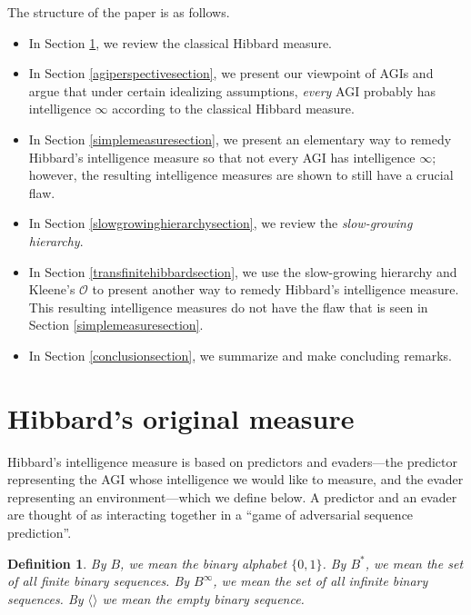 \documentclass{article}
\newtheorem{definition}{Definition}
\begin{document}
The structure of the paper is as follows.
\begin{itemize}
    \item
    In Section \ref{originalmeasuresection}, we review the classical Hibbard measure.
    \item
    In Section \ref{agiperspectivesection}, we present our viewpoint of AGIs and argue that
    under certain idealizing assumptions, \emph{every} AGI probably has intelligence
    $\infty$ according to the classical Hibbard measure.
    \item
    In Section \ref{simplemeasuresection}, we present an elementary way to
    remedy Hibbard's intelligence
    measure so that not every AGI has intelligence $\infty$; however, the resulting
    intelligence measures are shown to still have a crucial flaw.
    \item
    In Section \ref{slowgrowinghierarchysection}, we review the \emph{slow-growing hierarchy}.
    \item
    In Section \ref{transfinitehibbardsection}, we use the
    slow-growing hierarchy and Kleene's $\mathcal O$
    to present another way to
    remedy Hibbard's intelligence measure. This resulting intelligence measures do not
    have the flaw that is seen in Section \ref{simplemeasuresection}.
    \item
    In Section \ref{conclusionsection}, we summarize and make concluding remarks.
\end{itemize}

\section{Hibbard's original measure}
\label{originalmeasuresection}

Hibbard's intelligence measure is based on predictors and evaders---the predictor
representing the AGI whose intelligence we would like to measure, and the evader
representing an environment---which we define below. A predictor and an evader
are thought of as interacting together in a ``game of adversarial sequence prediction''.

\begin{definition}
By $B$, we mean the binary alphabet $\{0,1\}$. By $B^*$, we mean the set of all
finite binary sequences. By $B^\infty$, we mean the set of all infinite binary
sequences. By $\langle\rangle$ we mean the empty binary sequence.
\end{definition}
\end{document}

